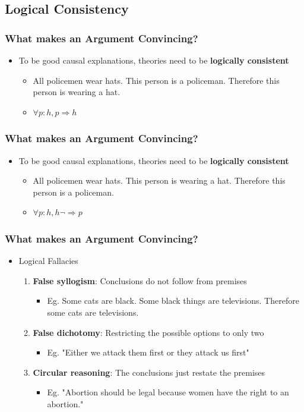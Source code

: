 \documentclass[xcolor=x11names,compress]{beamer}\usepackage[]{graphicx}\usepackage[]{color}
\renewcommand{\(}{\begin{columns}}
\renewcommand{\)}{\end{columns}}
\newcommand{\<}[1]{\begin{column}{#1}}
\renewcommand{\>}{\end{column}}
\begin{document}
\begin{frame}
\begin{frame}
\section{Logical Consistency}
\begin{frame}
\frametitle{What makes an Argument Convincing?}
\begin{itemize}
\item To be good causal explanations, theories need to be \textbf{logically consistent}
\begin{itemize}
\item All policemen wear hats. This person is a policeman. Therefore this person is wearing a hat.
\item $\forall p:  h, p \Rightarrow h$
\end{itemize}
\end{itemize}
\end{frame}

\begin{frame}
\frametitle{What makes an Argument Convincing?}
\begin{itemize}
\item To be good causal explanations, theories need to be \textbf{logically consistent}
\begin{itemize}
\item All policemen wear hats. This person is wearing a hat. Therefore this person is a policeman.
\item $\forall p:  h, h \lnot \Rightarrow p$  
\end{itemize}
\end{itemize}
\end{frame}

\begin{frame}
\frametitle{What makes an Argument Convincing?}
\begin{itemize}
\item Logical Fallacies
\begin{enumerate}
\item \textbf{False syllogism}: Conclusions do not follow from premises
\begin{itemize}
\item Eg. Some cats are black. Some black things are televisions. Therefore some cats are televisions.
\end{itemize}
\item \textbf{False dichotomy}: Restricting the possible options to only two
\begin{itemize}
\item Eg. "Either we attack them first or they attack us first"
\end{itemize}
\item \textbf{Circular reasoning}: The conclusions just restate the premises
\begin{itemize}
\item Eg. "Abortion should be legal because women have the right to an abortion."
\end{itemize}
\end{enumerate}
\end{itemize}
\end{frame}


\end{frame}
\end{frame}
\end{document}
